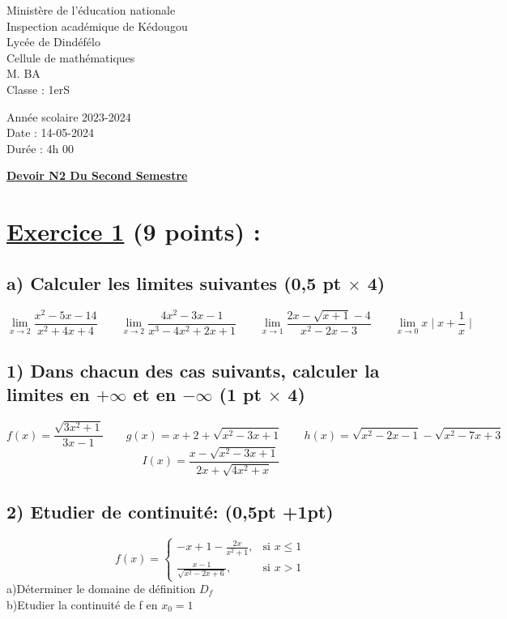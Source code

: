 \documentclass[12pt]{article}
\begin{document}
\begin{minipage}{0.5\textwidth}
	Ministère de l'éducation nationale  \\
	Inspection académique de Kédougou   \\
	Lycée de Dindéfélo            \\
	Cellule de mathématiques            \\
	M. BA                          \\
	Classe : 1erS  \\
\end{minipage}
\begin{minipage}{0.5\textwidth}
	Année scolaire 2023-2024 \\
	Date : 14-05-2024 \\
	Durée : 4h 00 \\
\end{minipage}

\begin{center}
	\textbf{{\underline{Devoir N2 Du Second Semestre}}}
\end{center}

\section*{\underline{Exercice 1} (9 points) :}
\subsection*{a) Calculer les limites suivantes (0,5 pt $\times$ 4)}
\[ \lim_{x \to 2}\frac{x^{2}-5x-14}{x^{2}+4x+4}\quad\quad 
\lim_{x \to 2}\frac{4x^{2}-3x-1}{x^{3}-4x^{2}+2x+1}\quad\quad 
\lim_{x \to 1}\frac{2x-\sqrt{x+1}-4}{x^{2}-2x-3}\quad\quad 
\lim_{x \to 0}x\mid x+\frac{1}{x}\mid\]
\subsection*{1) Dans chacun des cas suivants, calculer la limites en $+\infty$ et en $-\infty$ (1 pt $\times$ 4)}
\[ f(x)=\frac{\sqrt{3x^{2}+1}}{3x-1}\quad\quad 
g(x)=x+2+\sqrt{x^{2}-3x+1}\quad\quad 
h(x)=\sqrt{x^{2}-2x-1}-\sqrt{x^{2}-7x+3} \]
\[I(x)=\frac{x-\sqrt{x^{2}-3x+1}}{2x+\sqrt{4x^{2}+x}} \]
\subsection*{2) Etudier de continuité: (0,5pt +1pt)}
\[ f(x) = \begin{cases} 
  -x+1-\frac{2x}{x^{2}+1}, & \text{si } x \leq 1 \\
  \frac{x-1}{\sqrt{x^{2}-2x+6}}, & \text{si } x > 1
\end{cases} \]
a)Déterminer le domaine de définition $D_{f}$\\
b)Etudier la continuité de f en $x_{0}=1$
\end{document}

